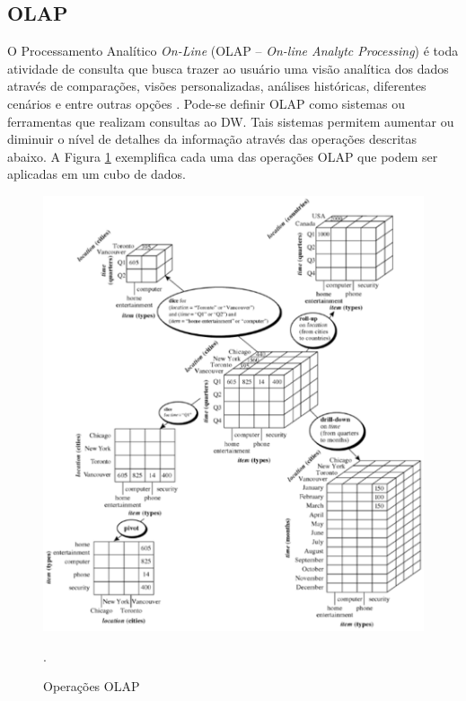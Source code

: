 \subsection{OLAP}

\label{sec-olap}

O Processamento Analítico \emph{On-Line} (OLAP – \emph{On-line Analytc Processing}) é toda atividade de consulta que busca trazer ao usuário uma visão analítica dos dados através de comparações, visões personalizadas, análises históricas, diferentes cenários e entre outras opções \cite{kimball2002}.
%
Pode-se definir OLAP como sistemas ou ferramentas que realizam consultas ao DW.
%
Tais sistemas permitem aumentar ou diminuir o nível de detalhes da informação através das operações descritas abaixo. A Figura \ref{dw-olap} exemplifica cada uma das operações OLAP que podem ser aplicadas em um cubo de dados. 

 \begin{figure}[!htb]
 	\centering
 		\includegraphics[scale=1]{figuras/olap}
 		\caption{Operações OLAP}.
 		\label{dw-olap}
 \end{figure}


